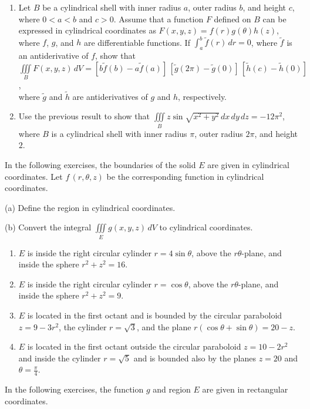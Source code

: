 \documentclass{exercises}
\begin{document}
\begin{enumerate}[start=1]
\begin{enumerate}[label=(\alph*)]
  \item Let $B$ be a cylindrical shell with inner radius $a$, outer radius $b$, and height $c$, where $0<a<b$ and $c>0$. Assume that a function $F$ defined on $B$ can be expressed in cylindrical coordinates as $F(x,y,z)=f(r)g(\theta)h(z)$, where $f$, $g$, and $h$ are differentiable functions. If $\int_{a}^{b}\tilde{f}(r)\,dr=0$, where $\tilde{f}$ is an antiderivative of $f$, show that\\ $\underset{B}{\iiint}F(x,y,z)\,dV=[b\tilde{f}(b)-a\tilde{f}(a)]\,[\tilde{g}(2\pi)-\tilde{g}(0)]\,[\tilde{h}(c)-\tilde{h}(0)]$,\\ where $\tilde{g}$ and $\tilde{h}$ are antiderivatives of $g$ and $h$, respectively.
  \item Use the previous result to show that $\underset{B}{\iiint}z\sin \sqrt{x^{2}+y^{2}}\,dx\,dy\,dz=-12\pi^{2}$, where $B$ is a cylindrical shell with inner radius $\pi$, outer radius $2\pi$, and height $2$.
\end{enumerate}
\end{enumerate}

In the following exercises, the boundaries of the solid $E$ are given in cylindrical coordinates. Let $f\,(r,\theta,z)$ be the corresponding function in cylindrical coordinates.


(a) Define the region in cylindrical coordinates.


(b) Convert the integral $\underset{E}{\iiint}g(x,y,z)\,dV$ to cylindrical coordinates.

\begin{enumerate}[resume]
\item $E$ is inside the right circular cylinder $r=4\sin \theta$, above the $r\theta$-plane, and inside the sphere $r^{2}+z^{2}=16$.
\item $E$ is inside the right circular cylinder $r=\cos \theta$, above the $r\theta$-plane, and inside the sphere $r^{2}+z^{2}=9$.
\item $E$ is located in the first octant and is bounded by the circular paraboloid $z=9-3r^{2}$, the cylinder $r=\sqrt{3}$, and the plane $r(\cos \theta+\sin \theta)=20-z$.
\item $E$ is located in the first octant outside the circular paraboloid $z=10-2r^{2}$ and inside the cylinder $r=\sqrt{5}$ and is bounded also by the planes $z=20$ and $\theta=\frac{\pi}{4}$.
\end{enumerate}

In the following exercises, the function $g$ and region $E$ are given in rectangular coordinates.
\end{document}
